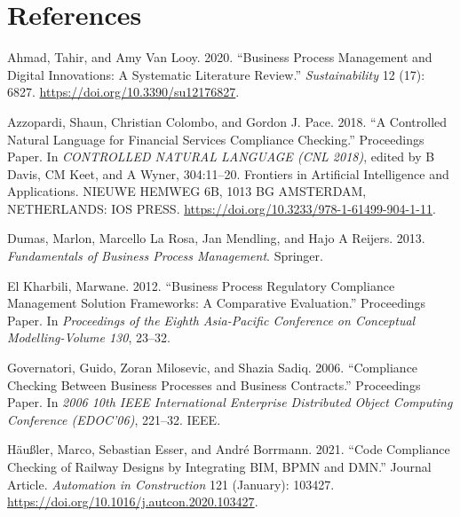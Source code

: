 \documentclass[
  letterpaper,
  DIV=11,
  numbers=noendperiod]{scrreprt}
\newlength{\cslhangindent}
\newlength{\cslentryspacingunit} %
\newenvironment{CSLReferences}[2] %
 {%
  \setlength{\parindent}{0pt}
  \ifodd #1
  \let\oldpar\par
  \def\par{\hangindent=\cslhangindent\oldpar}
  \fi
  \setlength{\parskip}{#2\cslentryspacingunit}
 }%
 {}
\begin{document}
\hypertarget{references}{%
\chapter*{References}\label{references}}


\hypertarget{refs}{}
\begin{CSLReferences}{1}{0}
\leavevmode{}%
Ahmad, Tahir, and Amy Van Looy. 2020. {``Business {Process Management}
and {Digital Innovations}: {A Systematic Literature Review}.''}
\emph{Sustainability} 12 (17): 6827.
\url{https://doi.org/10.3390/su12176827}.

\leavevmode{}%
Azzopardi, Shaun, Christian Colombo, and Gordon J. Pace. 2018. {``A
Controlled Natural Language for Financial Services Compliance
Checking.''} Proceedings Paper. In \emph{{CONTROLLED NATURAL LANGUAGE}
({CNL} 2018)}, edited by B Davis, CM Keet, and A Wyner, 304:11--20.
Frontiers in Artificial Intelligence and Applications. {NIEUWE HEMWEG
6B, 1013 BG AMSTERDAM, NETHERLANDS}: {IOS PRESS}.
\url{https://doi.org/10.3233/978-1-61499-904-1-11}.

\leavevmode{}%
Dumas, Marlon, Marcello La Rosa, Jan Mendling, and Hajo A Reijers. 2013.
\emph{Fundamentals of Business Process Management}. {Springer}.

\leavevmode{}%
El Kharbili, Marwane. 2012. {``Business Process Regulatory Compliance
Management Solution Frameworks: {A} Comparative Evaluation.''}
Proceedings Paper. In \emph{Proceedings of the {Eighth Asia-Pacific
Conference} on {Conceptual Modelling-Volume} 130}, 23--32.

\leavevmode{}%
Governatori, Guido, Zoran Milosevic, and Shazia Sadiq. 2006.
{``Compliance Checking Between Business Processes and Business
Contracts.''} Proceedings Paper. In \emph{2006 10th {IEEE International
Enterprise Distributed Object Computing Conference} ({EDOC}'06)},
221--32. {IEEE}.

\leavevmode{}%
Häußler, Marco, Sebastian Esser, and André Borrmann. 2021. {``Code
Compliance Checking of Railway Designs by Integrating {BIM}, {BPMN} and
{DMN}.''} Journal Article. \emph{Automation in Construction} 121
(January): 103427. \url{https://doi.org/10.1016/j.autcon.2020.103427}.


\end{CSLReferences}
\end{document}
